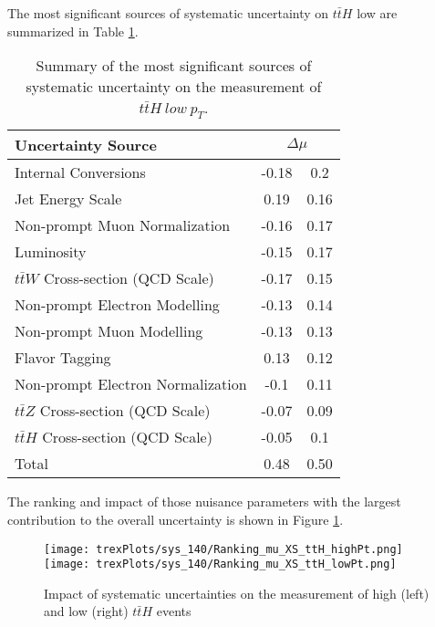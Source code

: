 The most significant sources of systematic uncertainty on $t\bar{t}H$ low \pt are summarized in Table \ref{tab:systematics_low_140}.

\begin{table}[H]
    \centering
    \begin{tabular}{l|cc}
        \hline\hline
        Uncertainty Source & \multicolumn{2}{c}{$\Delta \mu$ }  \\
        \hline
        Internal Conversions & -0.18 & 0.2 \\
        Jet Energy Scale & 0.19 & 0.16 \\
        Non-prompt Muon Normalization & -0.16 & 0.17 \\
        Luminosity & -0.15 & 0.17 \\
        $t\bar{t}W$ Cross-section (QCD Scale) & -0.17 & 0.15 \\
        Non-prompt Electron Modelling & -0.13 & 0.14 \\
        Non-prompt Muon Modelling & -0.13 & 0.13 \\
        Flavor Tagging & 0.13 & 0.12 \\
        Non-prompt Electron Normalization & -0.1 & 0.11 \\
        $t\bar{t}Z$ Cross-section (QCD Scale) & -0.07 & 0.09 \\
        $t\bar{t}H$ Cross-section (QCD Scale) & -0.05 & 0.1 \\
        \hline
        Total & 0.48 & 0.50 \\
        \hline\hline
    \end{tabular}
    \caption{Summary of the most significant sources of systematic uncertainty on the measurement of $t\bar{t}H\ low\ p_T$.}
    \label{tab:systematics_low_140}
\end{table}

The ranking and impact of those nuisance parameters with the largest contribution to the overall uncertainty is shown in Figure \ref{fig:ranking_140}.
                                                                                                                             
\begin{figure}[H]
    \centering                                                                                                               
    \texttt{[image: trexPlots/sys\_140/Ranking\_mu\_XS\_ttH\_highPt.png]}%
    \texttt{[image: trexPlots/sys\_140/Ranking\_mu\_XS\_ttH\_lowPt.png]}
    \caption{Impact of systematic uncertainties on the measurement of high \pt (left) and low \pt (right) $t\bar{t}H$ events}
    \label{fig:ranking_140}
\end{figure}

